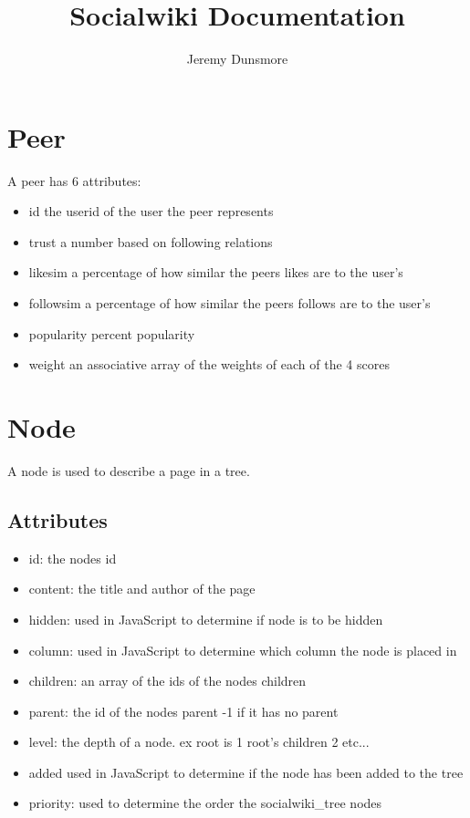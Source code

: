 \documentclass[letterpaper,twoside,11pt]{article}
\begin{document}



\title{Socialwiki Documentation}
\author{Jeremy Dunsmore}
\maketitle



\section{Peer}
 A peer has 6 attributes:
	\begin{itemize}
		\item id the userid of the user the peer represents
		\item	trust a number based on following relations 
		\item	likesim a percentage of how similar the peers likes are to the user's
		\item	followsim a percentage of how similar the peers follows are to the user's
		\item popularity percent popularity  
		\item weight an associative array of the weights of each of the 4 scores
	\end{itemize}

\section{Node}
A node is used to describe a page in a tree.
\subsection{Attributes}
\begin{itemize}
	\item id: the nodes id
	\item content: the title and author of the page
	\item hidden: used in JavaScript to determine if node is to be hidden
	\item column: used in JavaScript to determine which column the node is placed in
	\item children: an array of the ids of the nodes children
	\item parent: the id of the nodes parent -1 if it has no parent
	\item level: the depth of a node. ex root is 1 root's children 2 etc...
	\item added used in JavaScript to determine if the node has been added to the tree
	\item priority: used to determine the order the socialwiki\_tree nodes
\end{itemize}
\end{document}
